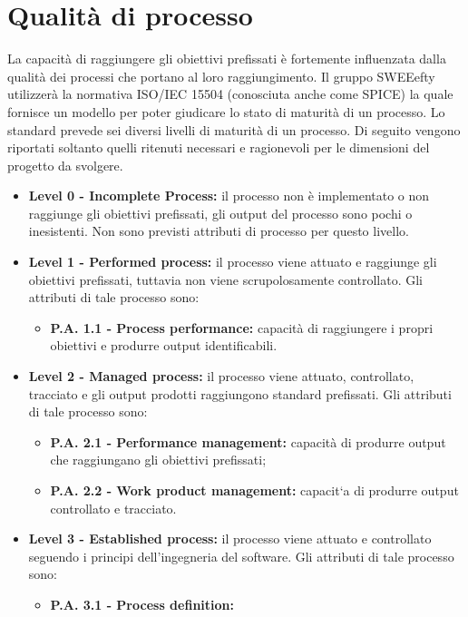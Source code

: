 \section{Qualità di processo}
La capacità di raggiungere gli obiettivi prefissati è fortemente influenzata dalla qualità dei processi che portano al loro raggiungimento. Il gruppo SWEEefty utilizzerà la normativa ISO/IEC 15504 (conosciuta anche come SPICE) la quale fornisce un modello per poter giudicare lo stato di maturità di un processo.
Lo standard prevede sei diversi livelli di maturità di un processo. Di seguito vengono riportati soltanto quelli ritenuti necessari e ragionevoli per le dimensioni del progetto da svolgere.
\begin{itemize}
	\item \textbf{Level 0 - Incomplete Process:}
	il processo non è implementato o non raggiunge  gli  obiettivi  prefissati,  gli  output  del  processo  sono  pochi  o	inesistenti.  
	Non sono previsti attributi di processo per questo livello.
	\item \textbf{Level 1 - Performed process:}
		il  processo  viene  attuato  e  raggiunge  gli
		obiettivi prefissati, tuttavia non viene scrupolosamente controllato.  Gli
		attributi di tale processo sono:
		\begin{itemize}
			\item \textbf{P.A. 1.1 - Process performance:}
			capacità  di  raggiungere  i  propri
			obiettivi e produrre output identificabili.
		\end{itemize}
	\item \textbf{Level 2 - Managed process:}
		il processo viene attuato, controllato, tracciato e gli output prodotti raggiungono standard prefissati.  Gli attributi di tale processo sono:
		\begin{itemize}
			\item \textbf{P.A. 2.1 - Performance management:}
				capacità  di  produrre  output che raggiungano gli obiettivi prefissati;
			\item \textbf{P.A. 2.2 - Work product management:}
				capacit`a di produrre output controllato e tracciato.
		\end{itemize}
	\item \textbf{Level 3 - Established process:}
		il processo viene attuato e controllato seguendo  i  principi  dell’ingegneria  del  software.   Gli  attributi  di  tale processo sono:
		\begin{itemize}
			\item \textbf{P.A. 3.1 - Process definition:}

\end{itemize}
\end{itemize}
